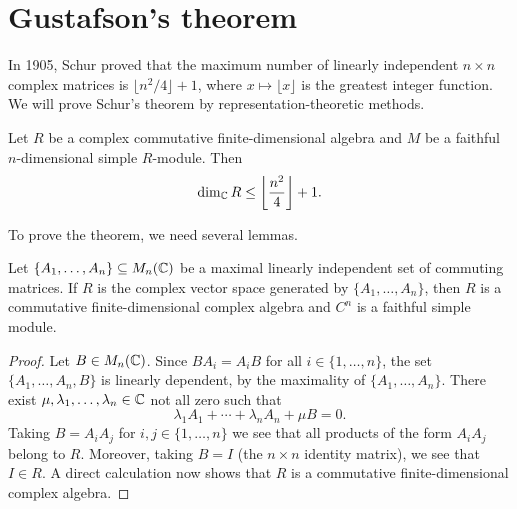 

\section{Gustafson's theorem}

In 1905, Schur proved that the maximum number of linearly independent 
$n\times n$ complex matrices is $\lfloor n^2/4\rfloor+1$, where $x\mapsto \lfloor x\rfloor$ is the 
greatest integer function. We will prove Schur's theorem by representation-theoretic methods.

\begin{theorem}[Gustafson]
\label{thm:Gustafson}
    Let $R$ be a complex commutative finite-dimensional algebra 
    and $M$ be a faithful $n$-dimensional simple $R$-module. Then
    \[
    \dim_{\mathbb{C}}R\leq\left\lfloor\frac{n^2}{4}\right\rfloor+1.
    \]
\end{theorem}

To prove the theorem, we need several lemmas. 

\begin{lemma}
\label{lem:Gustafson}
    Let $\{A_1,\dots,A_n\}\subseteq M_n(\mathbb{C})$ be a maximal linearly independent set of
    commuting matrices. If $R$ is the complex vector space
    generated by $\{A_1,\dots,A_n\}$, then $R$ 
    is a commutative finite-dimensional complex 
    algebra and $C^n$ is a faithful simple module. 
\end{lemma}

\begin{proof}
    Let $B\in M_n(\mathbb{C})$. Since $BA_i=A_iB$ for all $i\in\{1,\dots,n\}$, 
    the set $\{A_1,\dots,A_n,B\}$ is linearly dependent, by the 
    maximality of $\{A_1,\dots,A_n\}$. There exist $\mu,\lambda_1,\dots,\lambda_{n}\in\mathbb{C}$ not all zero
    such that 
    \[
    \lambda_1A_1+\cdots+\lambda_nA_n+\mu B=0.
    \]
    Taking $B=A_iA_j$ for $i,j\in\{1,\dots,n\}$ we see that 
    all products of the form $A_iA_j$ belong to $R$. Moreover, taking $B=I$ (the $n\times n$ 
    identity matrix), we see that $I\in R$. A direct calculation now shows that 
    $R$ is a commutative finite-dimensional complex algebra.
\end{proof}

